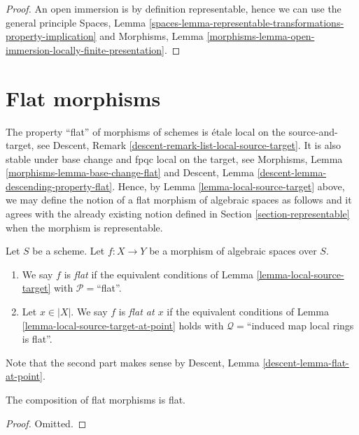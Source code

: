\begin{proof}
An open immersion is by definition representable, hence we can
use the general principle
Spaces,
Lemma \ref{spaces-lemma-representable-transformations-property-implication}
and
Morphisms,
Lemma \ref{morphisms-lemma-open-immersion-locally-finite-presentation}.
\end{proof}









\section{Flat morphisms}
\label{section-flat}

\noindent
The property ``flat'' of morphisms of schemes is
\'etale local on the source-and-target, see
Descent, Remark \ref{descent-remark-list-local-source-target}.
It is also stable under base change and fpqc local on the target, see
Morphisms, Lemma \ref{morphisms-lemma-base-change-flat} and
Descent, Lemma \ref{descent-lemma-descending-property-flat}.
Hence, by
Lemma \ref{lemma-local-source-target}
above, we may define the notion of a flat morphism of algebraic spaces as
follows and it agrees with the already existing notion defined in
Section \ref{section-representable}
when the morphism is representable.

\begin{definition}
\label{definition-flat}
Let $S$ be a scheme.
Let $f : X \to Y$ be a morphism of algebraic spaces over $S$.
\begin{enumerate}
\item We say $f$ is {\it flat} if the equivalent conditions of
Lemma \ref{lemma-local-source-target} with
$\mathcal{P} =$``flat''.
\item Let $x \in |X|$. We say $f$ is {\it flat at $x$} if the
equivalent conditions of
Lemma \ref{lemma-local-source-target-at-point}
holds with $\mathcal{Q} =$``induced map local rings is flat''.
\end{enumerate}
Note that the second part makes sense by
Descent, Lemma \ref{descent-lemma-flat-at-point}.
\end{definition}


\begin{lemma}
\label{lemma-composition-flat}
The composition of flat morphisms is flat.
\end{lemma}

\begin{proof}
Omitted.
\end{proof}

